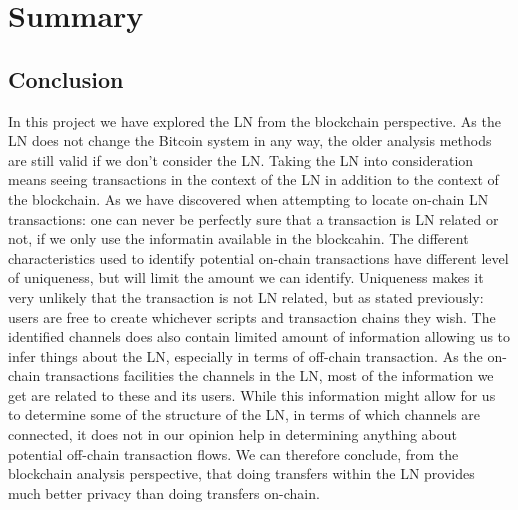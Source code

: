 \chapter{Summary}
\label{chap:conclusion}

\section{Conclusion}
In this project we have explored the LN from the blockchain perspective.
As the LN does not change the Bitcoin system in any way, the older analysis methods are still valid if we don't consider the LN. Taking the LN into consideration means seeing transactions in the context of the LN in addition to the context of the blockchain. As we have discovered when attempting to locate on-chain LN transactions: one can never be perfectly sure that a transaction is LN related or not, if we only use the informatin available in the blockcahin. The different characteristics used to identify potential on-chain transactions have different level of uniqueness, but will limit the amount we can identify. Uniqueness makes it very unlikely that the transaction is not LN related, but as stated previously: users are free to create whichever scripts and transaction chains they wish. 
The identified channels does also contain limited amount of information allowing us to infer things about the LN, especially in terms of off-chain transaction. As the on-chain transactions facilities the channels in the LN, most of the information we get are related to these and its users.
While this information might allow for us to determine some of the structure of the LN, in terms of which channels are connected, it does not in our opinion help in determining anything about potential off-chain transaction flows. We can therefore conclude, from the blockchain analysis perspective, that doing transfers within the LN provides much better privacy than doing transfers on-chain.
\\


